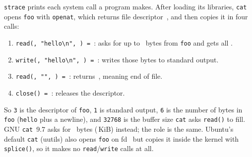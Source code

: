 
\texttt{strace} prints each system call a program makes. After loading its
libraries, \texttt{cat} opens \texttt{foo} with \texttt{openat}, which returns
file descriptor~\straceReadFd, and then copies it in four calls:
\begin{enumerate}
  \item \texttt{read(\straceReadFd, "hello\textbackslash n", \straceBufSize) = \straceBytes}:
    asks for up to \straceBufSize{}~bytes from \texttt{foo} and gets all
    \straceBytes.
  \item \texttt{write(\straceWriteFd, "hello\textbackslash n", \straceBytes) = \straceBytes}:
    writes those bytes to standard output.
  \item \texttt{read(\straceReadFd, "", \straceBufSize) = \straceEofRet}:
    returns~\straceEofRet, meaning end of file.
  \item \texttt{close(\straceReadFd) = \straceCloseRet}: releases the
    descriptor.
\end{enumerate}

So \texttt{3} is the descriptor of \texttt{foo}, \texttt{1} is standard output,
\texttt{6} is the number of bytes in \texttt{foo} (\texttt{hello} plus a
newline), and \texttt{32768} is the buffer size \texttt{cat} asks
\texttt{read()} to fill. GNU \texttt{cat}~9.7 asks for \straceBufSize{}~bytes
(\straceBufKiB\,KiB) instead; the role is the same. Ubuntu's default
\texttt{cat} (uutils) also opens \texttt{foo} on fd~\straceReadFd{} but copies
it inside the kernel with \texttt{splice()}, so it makes no
\texttt{read}/\texttt{write} calls at all.
